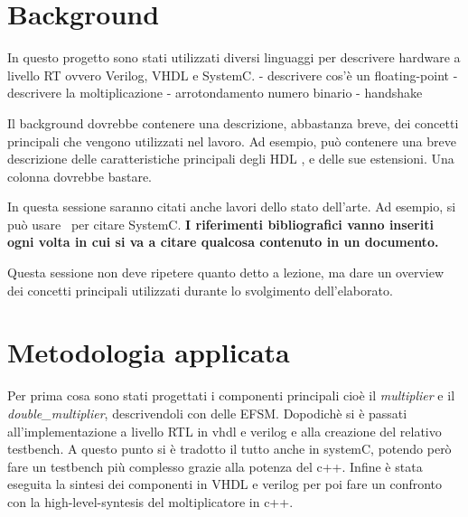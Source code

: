 \documentclass[]{IEEEtran}
\begin{document}
\section{Background}
In questo progetto sono stati utilizzati diversi linguaggi per descrivere hardware a livello RT ovvero Verilog, VHDL e SystemC.
- descrivere cos'è un floating-point
- descrivere la moltiplicazione
- arrotondamento numero binario
- handshake

Il background dovrebbe contenere una descrizione, abbastanza breve, dei concetti principali che vengono utilizzati nel lavoro. Ad esempio, può contenere una breve descrizione delle caratteristiche principali degli HDL , e delle sue estensioni. Una colonna dovrebbe bastare.

In questa sessione saranno citati anche lavori dello stato dell'arte. Ad esempio, si può usare~\cite{SystemC} per citare SystemC. \textbf{I riferimenti bibliografici vanno inseriti ogni volta in cui si va a citare qualcosa contenuto in un documento.}

Questa sessione non deve ripetere quanto detto a lezione, ma dare un overview dei concetti principali utilizzati durante lo svolgimento dell'elaborato.


\section{Metodologia applicata}
Per prima cosa sono stati progettati i componenti principali cioè il {\it multiplier} e il {\it double\_multiplier}, descrivendoli con delle EFSM. Dopodichè si è passati all'implementazione a livello RTL in vhdl e verilog e alla creazione del relativo testbench. A questo punto si è tradotto il tutto anche in systemC, potendo però fare un testbench più complesso grazie alla potenza del c++. Infine è stata eseguita la sintesi dei componenti in VHDL e verilog per poi fare un confronto con la high-level-syntesis del moltiplicatore in c++.
\end{document}
